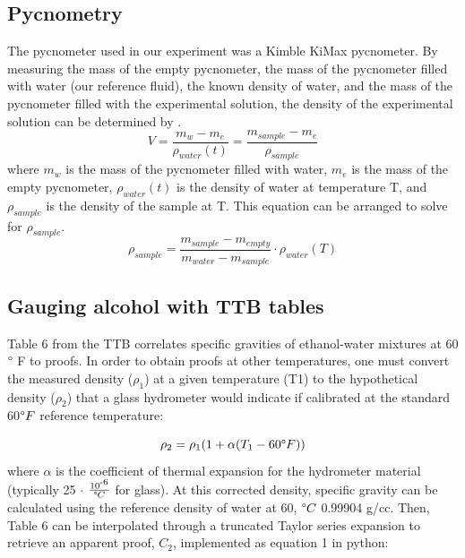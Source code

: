 \documentclass[lettersize,journal]{IEEEtran}
\begin{document}
	\subsection{Pycnometry}
	The pycnometer used in our experiment was a Kimble KiMax pycnometer. By measuring the mass of the empty pycnometer, the mass of the pycnometer filled with water (our reference fluid), the known density of water, and the mass of the pycnometer filled with the experimental solution, the density of the experimental solution can be determined by \cite{ref1}. 
	\begin{equation}
		\label{deqn_ex1}
		V = \frac{m_{w}-m_{e}}{\rho_{water}(t)} = \frac{m_{sample}-m_{e}}{\rho_{sample}}
	\end{equation}
	where $m_{w}$ is the mass of the pycnometer filled with water, $m_{e}$ is the mass of the empty pycnometer, $\rho_{water}(t)$ is the density of water at temperature T, and $\rho_{sample}$ is the density of the sample at T. This equation can be arranged to solve for $\rho_{sample}$.
	\begin{equation}
		\label{deqn_ex2}
		\rho_{sample}  = \frac{m_{sample} - m_{empty}}{m_{water}-m_{sample}}\cdot\rho_{water}(T)
	\end{equation}
	
	\subsection{Gauging alcohol with TTB tables}
	Table 6 from the TTB correlates specific gravities of ethanol-water mixtures at 60$\degree$ F to proofs. In order to obtain proofs at other temperatures, one must convert the measured density ($\rho_{1}$) at a given temperature (T1) to the hypothetical density ($\rho_{2}$) that a glass hydrometer would indicate if calibrated at the standard 60$\degree F$ reference temperature:
	
	\begin{equation}
		\label{deqn_ex3}
		\rho_{2} = \rho_{1} (1 + \alpha(T_{1} - 60\degree F))
	\end{equation}
	where $\alpha$ is the coefficient of thermal expansion for the hydrometer material (typically 25 $\cdot$ $\frac{10\textsuperscript{-6}}{\degree C}$ for glass).
	At this corrected density, specific gravity can be calculated using the reference density of water at 60, $\degree C$ 0.99904 g/cc. Then, Table 6 can be interpolated through a truncated Taylor series expansion to retrieve an apparent proof, $C_{2}$, implemented as equation 1 in python:
	 
\end{document}
